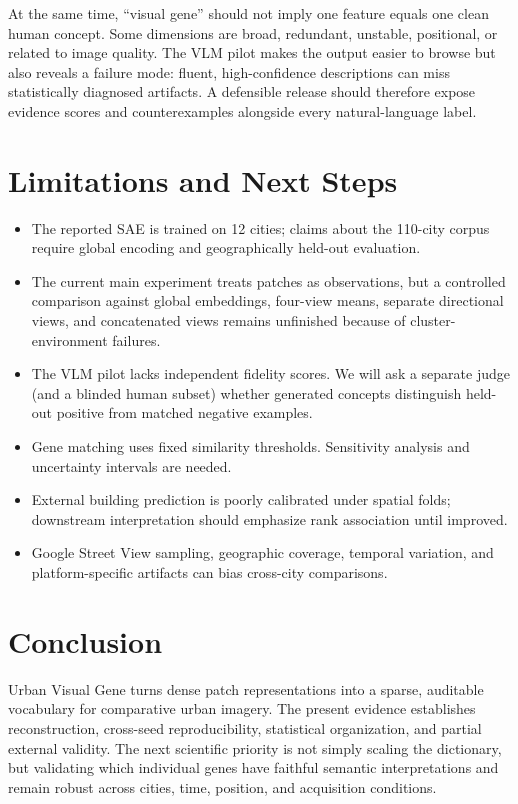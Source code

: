 \documentclass[10pt]{article}
\newcommand{\method}{Urban Visual Gene}
\begin{document}
At the same time, ``visual gene'' should not imply one feature equals one clean human
concept. Some dimensions are broad, redundant, unstable, positional, or related to
image quality. The VLM pilot makes the output easier to browse but also reveals a
failure mode: fluent, high-confidence descriptions can miss statistically diagnosed
artifacts. A defensible release should therefore expose evidence scores and
counterexamples alongside every natural-language label.

\section{Limitations and Next Steps}
\begin{itemize}[leftmargin=*]
  \item The reported SAE is trained on 12 cities; claims about the 110-city corpus
  require global encoding and geographically held-out evaluation.
  \item The current main experiment treats patches as observations, but a controlled
  comparison against global embeddings, four-view means, separate directional views,
  and concatenated views remains unfinished because of cluster-environment failures.
  \item The VLM pilot lacks independent fidelity scores. We will ask a separate judge
  (and a blinded human subset) whether generated concepts distinguish held-out
  positive from matched negative examples.
  \item Gene matching uses fixed similarity thresholds. Sensitivity analysis and
  uncertainty intervals are needed.
  \item External building prediction is poorly calibrated under spatial folds;
  downstream interpretation should emphasize rank association until improved.
  \item Google Street View sampling, geographic coverage, temporal variation, and
  platform-specific artifacts can bias cross-city comparisons.
\end{itemize}

\section{Conclusion}
\method{} turns dense patch representations into a sparse, auditable vocabulary for
comparative urban imagery. The present evidence establishes reconstruction,
cross-seed reproducibility, statistical organization, and partial external validity.
The next scientific priority is not simply scaling the dictionary, but validating
which individual genes have faithful semantic interpretations and remain robust
across cities, time, position, and acquisition conditions.
\end{document}
